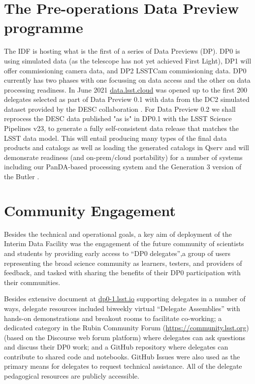 \documentclass[11pt,twoside]{article}
\begin{document}
\section {The Pre-operations Data Preview programme}
The IDF is hosting what is the first of a series of Data Previews (DP). DP0 is using simulated data (as the telescope has not yet achieved First Light), DP1 will offer commissioning camera data,
and DP2 LSSTCam commissioning data.
DP0 currently has two phases\citep{RTN-001} with one focussing on data access and the other on data processing readiness.
In June 2021 \href{https://data.lsst.cloud}{data.lsst.cloud} was opened up to the first 200 delegates selected as part of Data Preview 0.1 with data from the DC2 simulated dataset provided by the DESC collaboration \citep{arXiv:2010.05926}.
For Data Preview 0.2 we shall reprocess the DESC data published "as is" in DP0.1 with the LSST Science Pipelines v23, to generate a fully self-consistent data release that matches the LSST data model.
This will entail producing many types of the final data products and catalogs as well as loading the  generated catalogs in Qserv and will demonsrate readiness (and on-prem/cloud portability) for a number of systems including our PanDA-based processing system and the Generation 3 version of the Butler \citep{2019ASPC..523..653J}.

\section{Community Engagement }

Besides the technical and operational goals, a key aim of deployment of the Interim Data Facility was the engagement of the future community of scientists and students by providing early access to ``DP0 delegates'',a group of users representing the broad science community as learners, testers, and providers of feedback, and tasked with sharing the benefits of their DP0 participation with their communities.

Besides extensive document at \href{https://dp0-1.lsst.io}{dp0-1.lsst.io} supporting delegates in a number of ways, delegate resources included biweekly virtual ``Delegate Assemblies'' with hands-on demonstrations and breakout rooms to facilitate co-working; a dedicated category in the Rubin Community Forum (\url{https://community.lsst.org}) (based on the Discourse web forum platform) where delegates can ask questions and discuss their DP0 work; and a GitHub repository where delegates can contribute to shared code and notebooks.
GitHub Issues were also used as the primary means for delegates to request technical assistance. All of the delegate pedagogical resources are publicly accessible.
\end{document}
